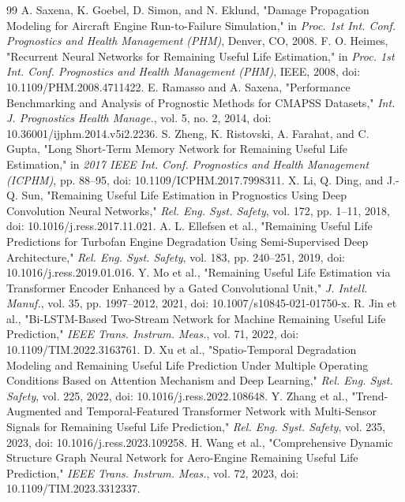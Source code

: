 \documentclass[preprint,10pt]{elsarticle}
\begin{document}
\begin{thebibliography}{99}
  A. Saxena, K. Goebel, D. Simon, and N. Eklund, "Damage Propagation Modeling for Aircraft Engine Run-to-Failure Simulation," in \textit{Proc. 1st Int. Conf. Prognostics and Health Management (PHM)}, Denver, CO, 2008.
  F. O. Heimes, "Recurrent Neural Networks for Remaining Useful Life Estimation," in \textit{Proc. 1st Int. Conf. Prognostics and Health Management (PHM)}, IEEE, 2008, doi: 10.1109/PHM.2008.4711422.
  E. Ramasso and A. Saxena, "Performance Benchmarking and Analysis of Prognostic Methods for CMAPSS Datasets," \textit{Int. J. Prognostics Health Manage.}, vol. 5, no. 2, 2014, doi: 10.36001/ijphm.2014.v5i2.2236.
  S. Zheng, K. Ristovski, A. Farahat, and C. Gupta, "Long Short-Term Memory Network for Remaining Useful Life Estimation," in \textit{2017 IEEE Int. Conf. Prognostics and Health Management (ICPHM)}, pp. 88–95, doi: 10.1109/ICPHM.2017.7998311.
  X. Li, Q. Ding, and J.-Q. Sun, "Remaining Useful Life Estimation in Prognostics Using Deep Convolution Neural Networks," \textit{Rel. Eng. Syst. Safety}, vol. 172, pp. 1–11, 2018, doi: 10.1016/j.ress.2017.11.021.
  A. L. Ellefsen et al., "Remaining Useful Life Predictions for Turbofan Engine Degradation Using Semi-Supervised Deep Architecture," \textit{Rel. Eng. Syst. Safety}, vol. 183, pp. 240–251, 2019, doi: 10.1016/j.ress.2019.01.016.
  Y. Mo et al., "Remaining Useful Life Estimation via Transformer Encoder Enhanced by a Gated Convolutional Unit," \textit{J. Intell. Manuf.}, vol. 35, pp. 1997–2012, 2021, doi: 10.1007/s10845-021-01750-x.
  R. Jin et al., "Bi-LSTM-Based Two-Stream Network for Machine Remaining Useful Life Prediction," \textit{IEEE Trans. Instrum. Meas.}, vol. 71, 2022, doi: 10.1109/TIM.2022.3163761.
  D. Xu et al., "Spatio-Temporal Degradation Modeling and Remaining Useful Life Prediction Under Multiple Operating Conditions Based on Attention Mechanism and Deep Learning," \textit{Rel. Eng. Syst. Safety}, vol. 225, 2022, doi: 10.1016/j.ress.2022.108648.
  Y. Zhang et al., "Trend-Augmented and Temporal-Featured Transformer Network with Multi-Sensor Signals for Remaining Useful Life Prediction," \textit{Rel. Eng. Syst. Safety}, vol. 235, 2023, doi: 10.1016/j.ress.2023.109258.
  H. Wang et al., "Comprehensive Dynamic Structure Graph Neural Network for Aero-Engine Remaining Useful Life Prediction," \textit{IEEE Trans. Instrum. Meas.}, vol. 72, 2023, doi: 10.1109/TIM.2023.3312337.

\end{thebibliography}
\end{document}
